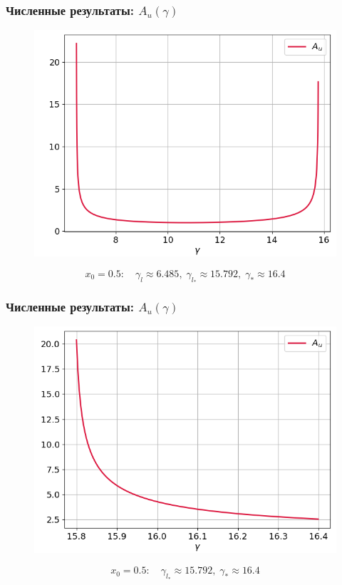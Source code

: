 \documentclass[fullscreen=true, unicode, bookmarks=false]{beamer}
\begin{document}
\begin{frame}
\frametitle{ Численные результаты: $ A_u(\gamma) $ }

\begin{figure} 
\includegraphics[scale=0.55]{divergent_amplitude_12_2.png}  
\end{figure}

$$ x_0 = 0.5: \quad \gamma_l \approx 6.485, \; \gamma_{l_*} \approx 15.792, \; \gamma_* \approx 16.4 $$

\end{frame}

\begin{frame}
\frametitle{ Численные результаты: $ A_u(\gamma) $ }

\begin{figure} 
\includegraphics[scale=0.55]{divergent_amplitude_12_3.png}  
\end{figure}

$$ x_0 = 0.5: \quad \gamma_{l_*} \approx 15.792, \; \gamma_* \approx 16.4 $$

\end{frame}
\end{document}
